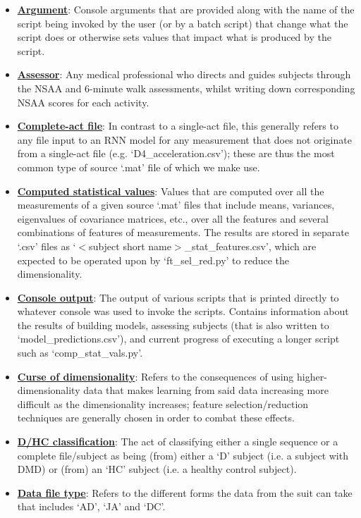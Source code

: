 \documentclass[12pt,twoside]{report}
\begin{document}
\begin{itemize}
	\item \underline{\textbf{Argument}}: Console arguments that are provided along with the name of the script being invoked by the user (or by a batch script) that change what the script does or otherwise sets values that impact what is produced by the script.
	\item \underline{\textbf{Assessor}}: Any medical professional who directs and guides subjects through the NSAA and 6-minute walk assessments, whilst writing down corresponding NSAA scores for each activity.
	\item \underline{\textbf{Complete-act file}}: In contrast to a single-act file, this generally refers to any file input to an RNN model for any measurement that does not originate from a single-act file (e.g. ‘D4\_acceleration.csv’); these are thus the most common type of source ‘.mat’ file of which we make use.
	\item \underline{\textbf{Computed statistical values}}: Values that are computed over all the measurements of a given source ‘.mat’ files that include means, variances, eigenvalues of covariance matrices, etc., over all the features and several combinations of features of measurements. The results are stored in separate ‘.csv’ files as ‘$<$subject short name$>$\_stat\_features.csv’, which are expected to be operated upon by ‘ft\_sel\_red.py’ to reduce the dimensionality.
	\item \underline{\textbf{Console output}}: The output of various scripts that is printed directly to whatever console was used to invoke the scripts. Contains information about the results of building models, assessing subjects (that is also written to ‘model\_predictions.csv’), and current progress of executing a longer script such as ‘comp\_stat\_vals.py’.
	\item \underline{\textbf{Curse of dimensionality}}: Refers to the consequences of using higher-dimensionality data that makes learning from said data increasing more difficult as the dimensionality increases; feature selection/reduction techniques are generally chosen in order to combat these effects.
	\item \underline{\textbf{D/HC classification}}: The act of classifying either a single sequence or a complete file/subject as being (from) either a ‘D’ subject (i.e. a subject with DMD) or (from) an ‘HC’ subject (i.e. a healthy control subject).
	\item \underline{\textbf{Data file type}}: Refers to the different forms the data from the suit can take that includes ‘AD’, ‘JA’ and ‘DC’.

\end{itemize}
\end{document}

